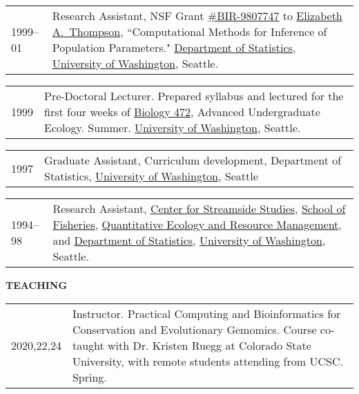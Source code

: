 \documentclass[11pt]{article}
\newlength{\myindent}
\newlength{\postskip}
\newlength{\preskip}
\newlength{\scndcol}
\begin{document}
\begin{tabular}{ @{}p{2.5\myindent} p{\scndcol}@{}  }
\hspace*{\myindent}1999--01 &  Research Assistant, NSF Grant \href{http://www.fastlane.nsf.gov/servlet/showaward?award=9807747}{\#BIR-9807747} to
\href{http://www.stat.washington.edu/thompson/}{Elizabeth A.~Thompson}, ``Computational Methods for Inference of Population
Parameters." \href{http://www.stat.washington.edu/}{Department of Statistics}, \href{http://www.washington.edu/}{University of Washington}, Seattle. 
\end{tabular}

\begin{tabular}{ @{}p{2.5\myindent} p{\scndcol}@{}  }
\hspace*{\myindent}1999 &  Pre-Doctoral Lecturer. Prepared syllabus and lectured
for the first four weeks of \href{http://www.washington.edu/students/crscat/biology.html}{Biology 472}, Advanced Undergraduate Ecology.  Summer.  
\href{http://www.washington.edu/}{University of Washington}, Seattle.
\end{tabular}

\begin{tabular}{ @{}p{2.5\myindent} p{\scndcol}@{}  }
\hspace*{\myindent}1997 & Graduate Assistant, Curriculum development,
Department of Statistics, \href{http://www.washington.edu/}{University of Washington}, Seattle\end{tabular}

\begin{tabular}{ @{}p{2.5\myindent} p{\scndcol}@{}  }
\hspace*{\myindent}1994--98 &  Research Assistant, \href{http://depts.washington.edu/cssuw/}{Center for Streamside
Studies},  \href{http://www.fish.washington.edu/}{School of Fisheries}, \href{http://depts.washington.edu/qerm/}{Quantitative Ecology and Resource
Management}, and \href{http://www.stat.washington.edu/}{Department of Statistics}, \href{http://www.washington.edu/}{University of Washington}, Seattle. \\
\end{tabular}
\vspace*{\postskip}


{\bf TEACHING}
\vspace*{\preskip}


\begin{tabular}{ @{}p{2.5\myindent} p{\scndcol}@{}  }
\hspace*{\myindent}2020,22,24 &  Instructor.  Practical Computing and Bioinformatics for Conservation and Evolutionary Gemomics. Course co-taught with Dr. Kristen Ruegg at Colorado State University, with remote students attending from UCSC. Spring.
\end{tabular}
\end{document}
